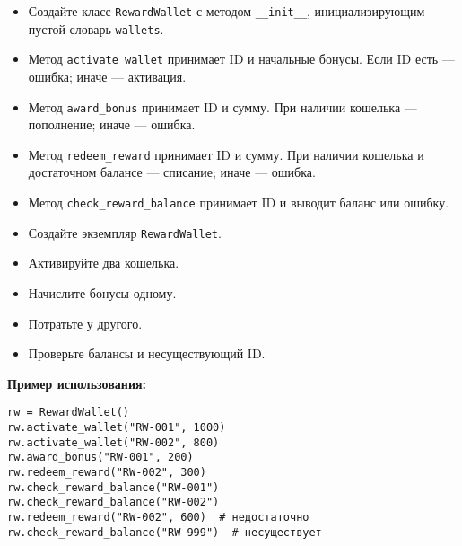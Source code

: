 \begin{enumerate}
\begin{itemize}
    \item Создайте класс \texttt{RewardWallet} с методом \texttt{\_\_init\_\_}, инициализирующим пустой словарь \texttt{wallets}.
    \item Метод \texttt{activate\_wallet} принимает ID и начальные бонусы. Если ID есть — ошибка; иначе — активация.
    \item Метод \texttt{award\_bonus} принимает ID и сумму. При наличии кошелька — пополнение; иначе — ошибка.
    \item Метод \texttt{redeem\_reward} принимает ID и сумму. При наличии кошелька и достаточном балансе — списание; иначе — ошибка.
    \item Метод \texttt{check\_reward\_balance} принимает ID и выводит баланс или ошибку.
    \item Создайте экземпляр \texttt{RewardWallet}.
    \item Активируйте два кошелька.
    \item Начислите бонусы одному.
    \item Потратьте у другого.
    \item Проверьте балансы и несуществующий ID.
\end{itemize}

\textbf{Пример использования:}

\begin{verbatim}
rw = RewardWallet()
rw.activate_wallet("RW-001", 1000)
rw.activate_wallet("RW-002", 800)
rw.award_bonus("RW-001", 200)
rw.redeem_reward("RW-002", 300)
rw.check_reward_balance("RW-001")
rw.check_reward_balance("RW-002")
rw.redeem_reward("RW-002", 600)  # недостаточно
rw.check_reward_balance("RW-999")  # несуществует
\end{verbatim}
\end{enumerate}
